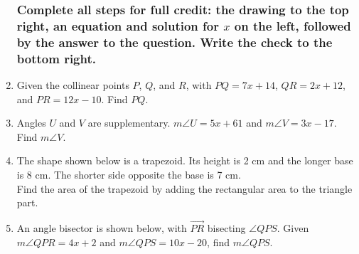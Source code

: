 \documentclass[12pt, twoside]{article}
\begin{document}
\begin{enumerate}
\newpage

\subsubsection*{Complete all steps for full credit: the drawing to the top right, an equation and solution for $x$ on the left, followed by the answer to the question. Write the check to the bottom right.}

  \item Given the collinear points $P$, $Q$, and $R$, with $PQ=7x+14$, $QR=2x+12$, and $PR=12x-10$. Find ${PQ}$.
  \vspace{9cm}

  \item Angles $U$ and $V$ are supplementary. $m\angle U = 5x+61$ and $m\angle V = 3x-17$. Find $m\angle V$. \vspace{7cm}


\newpage

\item The shape shown below is a trapezoid. Its height is 2 cm and the longer base is 8 cm. The shorter side opposite the base is 7 cm. \\[0.25cm]
Find the area of the trapezoid by adding the rectangular area to the triangle part.
\begin{flushright} 
\end{flushright} 
 \vspace{4cm}

  \item An angle bisector is shown below, with $\overrightarrow{PR}$ bisecting $\angle QPS$. Given $m\angle QPR = 4x+2$ and $m\angle QPS = 10x-20$, find $m\angle QPS$.
  \begin{flushright}
  \end{flushright}


\end{enumerate}
\end{document}
